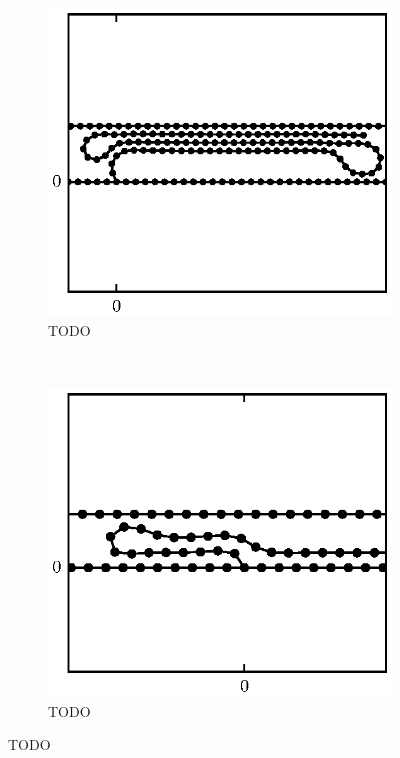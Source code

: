 \begin{figure}
		\begin{subfigure}{.5\textwidth}
			\centering
			\includegraphics{./fig/ch3/push/et0.1/l4.5_m1.eps}
			\caption{TODO \label{subfig:push_crumple3}}
		\end{subfigure}%
		~
		\begin{subfigure}{.5\textwidth}
			\centering
			\includegraphics{./fig/ch3/push/et0.1/l6_m4.eps}
			\caption{TODO \label{subfig:push_crumple3}}
		\end{subfigure}	
		\caption{TODO\label{fig:push_crumple}}	
	\end{figure}

